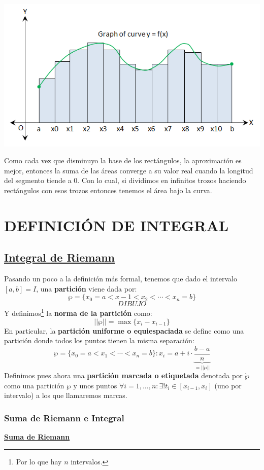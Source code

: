 \documentclass[10pt,a4paper,openright]{book}
\begin{document}
\begin{center}
\includegraphics[scale=0.4]{integral de curvas}
\end{center}

Como cada vez que disminuyo la base de los rectángulos, la aproximación es mejor, entonces la suma de las áreas converge a su valor real cuando la longitud del segmento tiende a 0. Con lo cual, si dividimos en infinitos trozos haciendo rectángulos con esos trozos entonces tenemos el área bajo la curva.

\section*{DEFINICIÓN DE INTEGRAL}
\subsection*{\underline{Integral de Riemann}}
Pasando un poco a la definición más formal, tenemos que dado el intervalo $[a,b]=I$, una \textbf{partición} viene dada por:
$$\wp=\{x_0=a<x-1<x_2<\cdots <x_n=b\}$$
$$DIBUJO$$
Y definimos\footnote{Por lo que hay $n$ intervalos.} la \textbf{norma de la partición} como:
$$||\wp||=\max\{x_i-x_{i-1}\}$$
En particular, la \textbf{partición uniforme o equiespaciada} se define como una partición donde todos los puntos tienen la misma separación:
$$\wp=\{x_0=a < x_1< \cdots < x_n=b\}: x_i = a + i \cdot \underbrace{\frac{b-a}{n}}_{=||\wp||}$$
Definimos pues ahora una \textbf{partición marcada o etiquetada} denotada por $\mathring{\wp}$ como una partición $\wp$ y unos puntos $\forall i = 1, ..., n: \exists! t_i\in [x_{i-1}, x_i]$ (uno por intervalo) a los que llamaremos marcas.

\subsubsection*{Suma de Riemann e Integral}
\underline{\textbf{Suma de Riemann}}
\end{document}

